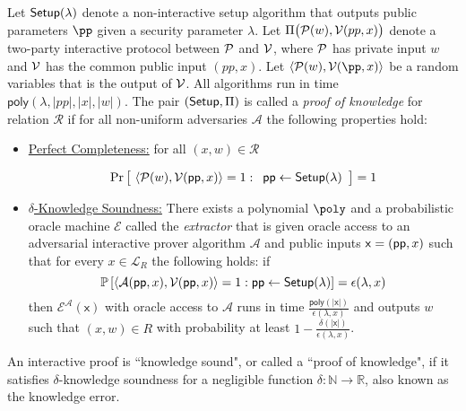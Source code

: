 \begin{definition} \label{def:proof}
 
Let $\textsf{{Setup}}(\lambda)$ denote a non-interactive setup algorithm that outputs public parameters $\pp$ given a security parameter $\lambda$. Let $\Pi\bigl(\mathcal{P}(w), \mathcal{V}(pp, x)\bigr)$ denote a two-party interactive protocol between $\mathcal{P}$ and $\mathcal{V}$, where $\mathcal{P}$ has private input $w$ and $\mathcal{V}$ has the common public input $(pp, x)$. Let $\langle \prover(w), \verifier(\pp, x) \rangle$ be a random variables that is the output of $\mathcal{V}$. All algorithms run in time $\textsf{poly}(\lambda, |pp|, |x|, |w|)$. The pair $(\textsf{{Setup}}, \Pi)$ is called a \emph{proof of knowledge} for relation $\mathcal{R}$ if for all non-uniform adversaries $\mathcal{A}$ the following properties hold: 

\begin{itemize}
\item \underline{Perfect Completeness:} for all $(x,w) \in \mathcal{R}$
\begin{small}
\[
\Pr \left[
         \ \langle \mathcal{P}(w), \mathcal{V}(\textsf{pp}, x) \rangle = 1 \\
:
\begin{array}{c}
             \textsf{pp} \leftarrow \textsf{{Setup}}(\lambda) \\
\end{array} 
\right]  = 1 
 \]
 \end{small}
\item \underline{$\delta$-Knowledge Soundness:}
There exists a polynomial $\poly$ and a probabilistic oracle machine $\mathcal{E}$ called the \emph{extractor} that is given oracle access to an adversarial interactive prover algorithm $\mathcal{A}$ and public inputs $\mathsf{x} = (\textsf{pp}, x)$ such that for every $x \in \mathcal{L}_R$ the following holds: if
$$\mathbb{P}\left[\langle \mathcal{A}(\textsf{pp}, x), \mathcal{V}(\textsf{pp}, x) \rangle = 1  : \textsf{pp} \gets \textsf{{Setup}}(\lambda) \right] = \epsilon(\lambda, x)$$
 then $\mathcal{E}^\mathcal{A}(\mathsf{x})$ with oracle access to $\mathcal{A}$ runs in time $\frac{\mathsf{poly}(|\mathsf{x}|)}{\epsilon(\lambda, x)}$ and outputs $w$ such that $(x, w) \in R$ with probability at least $1 - \frac{\delta(|\mathsf{x}|)}{\epsilon(\lambda, x)}$. 
\end{itemize} 
An interactive proof is ``knowledge sound", or called a ``proof of knowledge", if it satisfies $\delta$-knowledge soundness for a negligible function $\delta:\mathbb{N} \rightarrow \mathbb{R}$, also known as the knowledge error. 
\end{definition} 
